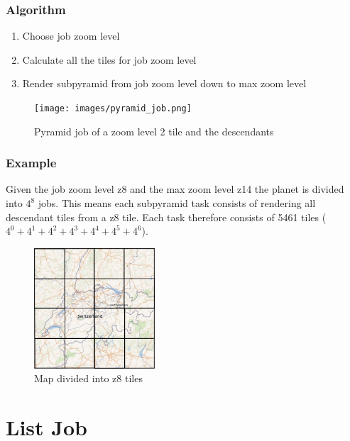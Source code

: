 \subsubsection*{Algorithm}

\begin{enumerate}  
    \item Choose job zoom level
    \item Calculate all the tiles for job zoom level
    \item Render subpyramid from job zoom level down to max zoom level
\end{enumerate}

\begin{figure}[H]
  \centering
  \texttt{[image: images/pyramid\_job.png]}
  \caption{Pyramid job of a zoom level 2 tile and the descendants}
\end{figure}

\subsubsection*{Example}

Given the job zoom level z8 and the max zoom level z14 the planet is divided into $4^{8}$ jobs.
This means each subpyramid task consists of rendering all descendant tiles from a z8 tile.
Each task therefore consists of 5461 tiles ($4^{0}+4^{1}+4^{2}+4^{3}+4^{4}+4^{5}+4^{6}$). \\

\begin{figure}[H]
  \centering
  \includegraphics[width=0.4\textwidth]{images/switzerland_tiled_z8_small.png}
  \caption{Map divided into z8 tiles}
\end{figure}

\section{List Job}\label{list-job}

